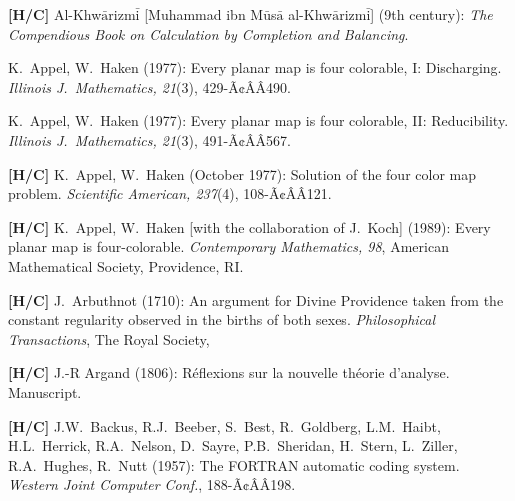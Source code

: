 
\begin{thebibliography}{999}
 


{\bf [H/C]}
Al-Khw$\bar{\mbox{a}}$rizm$\bar{\mbox{i}}$ [Muhammad ibn M$\bar{\mbox{u}}$s$\bar{\mbox{a}}$ al-Khw$\bar{\mbox{a}}$rizm$\bar{\mbox{i}}$] (9th century):
{\it The Compendious Book on Calculation by Completion and Balancing}.



K.~Appel, W.~Haken (1977):
Every planar map is four colorable, I: Discharging.
{\it Illinois J.~Mathematics, 21}(3), 429-Ã¢ÂÂ490.

K.~Appel, W.~Haken (1977):
Every planar map is four colorable, II: Reducibility.
{\it Illinois J.~Mathematics, 21}(3), 491-Ã¢ÂÂ567.

{\bf [H/C]}
K.~Appel, W.~Haken (October 1977):
Solution of the four color map problem.
{\it Scientific American, 237}(4), 108-Ã¢ÂÂ121.

{\bf [H/C]}
K.~Appel, W.~Haken [with the collaboration of J.~Koch] (1989):
Every planar map is four-colorable.
{\it Contemporary Mathematics, 98},
American Mathematical Society, Providence, RI.

{\bf [H/C]}
J.~Arbuthnot (1710): 
An argument for Divine Providence taken from the constant regularity observed in the births of both sexes.
{\it Philosophical Transactions}, The Royal Society,

{\bf [H/C]}
J.-R Argand (1806):
R\'{e}flexions sur la nouvelle th\'{e}orie d'analyse.  Manuscript.


{\bf [H/C]}
J.W.~Backus, R.J.~Beeber, S.~Best, R.~Goldberg, L.M.~Haibt, H.L.~Herrick, R.A.~Nelson, D.~Sayre, P.B.~Sheridan, H.~Stern, L.~Ziller, R.A.~Hughes, R.~Nutt (1957):
The FORTRAN automatic coding system.  {\it Western Joint Computer
Conf.}, 188-Ã¢ÂÂ198.


\end{thebibliography}

